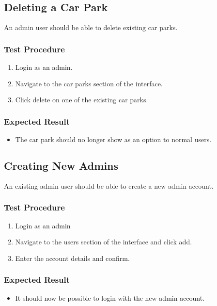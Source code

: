 \documentclass[a4paper, draft]{article}
\begin{document}
\subsection{Deleting a Car Park}
An admin user should be able to delete existing car parks.

\subsubsection{Test Procedure}
\begin{enumerate}
  \item Login as an admin.
  \item Navigate to the car parks section of the interface.
  \item Click delete on one of the existing car parks.
\end{enumerate}

\subsubsection{Expected Result}
\begin{itemize}
  \item The car park should no longer show as an option to normal users.
\end{itemize}

\subsection{Creating New Admins}
An existing admin user should be able to create a new admin account.

\subsubsection{Test Procedure}
\begin{enumerate}
  \item Login as an admin
  \item Navigate to the users section of the interface and click add.
  \item Enter the account details and confirm.
\end{enumerate}

\subsubsection{Expected Result}
\begin{itemize}
  \item It should now be possible to login with the new admin account.
\end{itemize}
\end{document}
